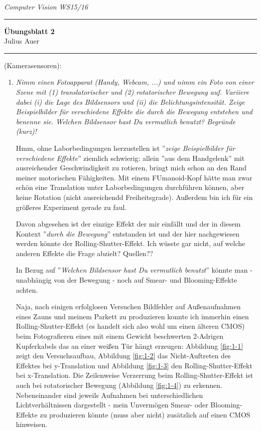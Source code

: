 \documentclass[a4paper, titlepage=false, parskip=full-, 10pt]{scrartcl}
\newcounter{tasknbr}
\newenvironment{task}[1]{{\bf Aufgabe \arabic {tasknbr}\stepcounter{tasknbr}} (#1):\begin{enumerate}}{\end{enumerate}}
\newcommand{\subtask}[1]{\item[#1)]}
\newcommand{\lecture}{Computer Vision WS15/16}
\newcommand{\tutor}{}
\newcommand{\assignmentnbr}{2}
\newcommand{\students}{Julius Auer}
\begin{document}
  
{\small \textsl{\lecture \hfill \tutor}}
\hrule
\begin{center}
\textbf{Übungsblatt \assignmentnbr}\\
[\bigskipamount]
{\small \students}
\end{center}
\hrule

\begin{task}{Kamerasensoren}
\subtask{1.1}
\emph{Nimm einen Fotoapparat (Handy, Webcam, ...) und nimm ein Foto von einer Szene mit (1) translatorischer und (2) rotatorischer Bewegung auf. Variiere dabei (i) die Lage des Bildsensors und (ii) die Belichtungsintensität. Zeige Beispielbilder für verschiedene Effekte die durch die Bewegung entstehen und benenne sie. Welchen Bildsensor hast Du vermutlich benutzt? Begründe (kurz)!}

Hmm, ohne Laborbedingungen herzustellen ist ''\emph{zeige Beispielbilder für verschiedene Effekte}'' ziemlich schwierig: allein ''aus dem Handgelenk'' mit ausreichender Geschwindigkeit zu rotieren, bringt mich schon an den Rand meiner motorischen Fähigkeiten. Mit einem FUmanoid-Kopf hätte man zwar schön eine Translation unter Laborbedingungen durchführen können, aber keine Rotation (nicht ausreichendd Freiheitsgrade). Außerdem bin ich für ein größeres Experiment gerade zu faul.

Davon abgesehen ist der einzige Effekt der mir einfällt und der in diesem Kontext ''\emph{durch die Bewegung}'' entstanden ist und der  hier nachgewiesen werden könnte der Rolling-Shutter-Effekt. Ich wüsste gar nicht, auf welche anderen Effekte die Frage abzielt? Quellen??

In Bezug auf ''\emph{Welchen Bildsensor hast Du vermutlich benutzt}'' könnte man - unabhängig von der Bewegung - noch auf Smear- und Blooming-Effekte achten.

Naja, nach einigen erfolglosen Versuchen Bildfehler auf Außenaufnahmen eines Zauns und meinem Parkett zu produzieren konnte ich immerhin einen Rolling-Shutter-Effekt (es handelt sich also wohl um einen älteren CMOS) beim Fotografieren eines mit einem Gewicht beschwerten 2-Adrigen Kupferkabels das an einer weißen Tür hängt erzeugen: Abbildung \ref{fig:1-1} zeigt den Versuchsaufbau, Abbildung \ref{fig:1-2} das Nicht-Auftreten des Effektes bei y-Translation und Abbildung \ref{fig:1-3} den Rolling-Shutter-Effekt bei x-Translation. Die Zeilenweise Verzerrung beim Rolling-Shutter-Effekt ist auch bei rotatorischer Bewegung (Abbildung \ref{fig:1-4}) zu erkennen. Nebeneinander sind jeweils Aufnahmen bei unterschiedlichen Lichtverhältnissen dargestellt - mein Unvermögen Smear- oder Blooming-Effekte zu produzieren könnte (muss aber nicht) zusätzlich auf einen CMOS hinweisen.


\end{task}
\end{document}
